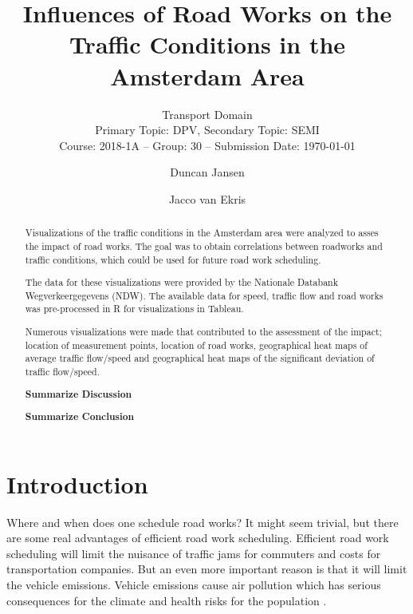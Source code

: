 \documentclass[sigconf]{acmart}
\begin{document}
\title{Influences of Road Works on the Traffic Conditions in the
Amsterdam Area}
\subtitle{
Transport Domain\\
Primary Topic: DPV, Secondary Topic: SEMI \\
Course: 2018-1A --  Group: 30 -- Submission Date: \today \\
}

\author{Duncan Jansen}

\author{Jacco van Ekris}

\begin{abstract}

Visualizations of the traffic conditions in the Amsterdam area were analyzed to asses the impact of road works. The goal was to obtain correlations between roadworks and traffic conditions, which could be used for future road work scheduling. 

The data for these visualizations were provided by the Nationale Databank Wegverkeergegevens (NDW). The available data for speed, traffic flow and road works was pre-processed in R for visualizations in Tableau.

Numerous visualizations were made that contributed to the assessment of the impact; location of measurement points, location of road works, geographical heat maps of average traffic flow/speed and geographical heat maps of the significant deviation of traffic flow/speed.

\textbf{Summarize Discussion}

\textbf{Summarize Conclusion}

\end{abstract}

\maketitle
\section{Introduction}

Where and when does one schedule road works? It might seem trivial, but there are some real advantages of efficient road work scheduling. Efficient road work scheduling will limit the nuisance of traffic jams for commuters and costs for transportation companies. But an even more important reason is that it will limit the vehicle emissions. Vehicle emissions cause air pollution which has serious consequences for the climate \cite{chapman2013urban} and health risks for the population \cite{zhang2013air}.
\end{document}
